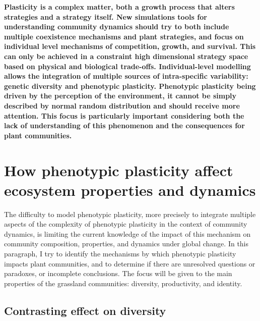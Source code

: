{%





\textbf{Plasticity is a complex matter, both a growth process that alters strategies and a strategy itself. New simulations tools for understanding community dynamics should try to both include multiple coexistence mechanisms and plant strategies, and focus on individual level mechanisms of competition, growth, and survival. This can only be achieved in a constraint high dimensional strategy space based on physical and biological trade-offs. Individual-level modelling allows the integration of multiple sources of intra-specific variability: genetic diversity and phenotypic plasticity. Phenotypic plasticity being driven by the perception of the environment, it cannot be simply described by normal random distribution and should receive more attention. This focus is particularly important considering both the lack of understanding of this phenomenon and the consequences for plant communities.}


\section{How phenotypic plasticity affect ecosystem properties and dynamics}

The difficulty to model phenotypic plasticity, more precisely to integrate multiple aspects of the complexity of phenotypic plasticity in the context of community dynamics, is limiting the current knowledge of the impact of this mechanism on community composition, properties, and dynamics under global change. In this paragraph, I try to identify the mechanisms by which phenotypic plasticity impacts plant communities, and to determine if there are unresolved questions or paradoxes, or incomplete conclusions. The focus will be given to the main properties of the grassland communities: diversity, productivity, and identity.



\subsection{Contrasting effect on diversity}

}
